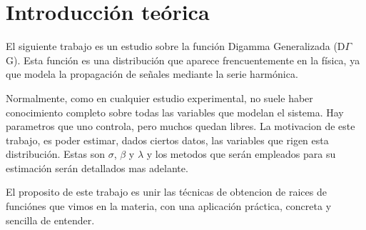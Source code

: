 \section{Introducci\'on teórica}

El siguiente trabajo es un estudio sobre la funci\'on Digamma Generalizada (D$\Gamma$G). Esta funci\'on es una
distribuci\'on que aparece frencuentemente en la f\'isica, ya que modela la propagaci\'on de se\~nales mediante la
serie harm\'onica.

Normalmente, como en cualquier estudio experimental, no suele haber conocimiento completo sobre todas las variables
que modelan el sistema. Hay parametros que uno controla, pero muchos quedan libres. La motivacion de este trabajo,
es poder estimar, dados ciertos datos, las variables que rigen esta distribuci\'on. Estas son $\sigma$, $\beta$ y $\lambda$
y los metodos que ser\'an empleados para su estimaci\'on ser\'an detallados mas adelante.

El proposito de este trabajo es unir las t\'ecnicas de obtencion de raices de funci\'ones que vimos en la materia,
con una aplicaci\'on pr\'actica, concreta y sencilla de entender.
